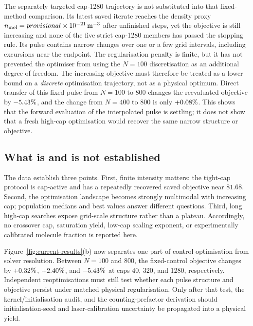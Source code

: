 \documentclass[9pt,a4paper,twocolumn,twoside]{rho-class/rho}
\newcommand{\ShowcaseTwelveEightyDensityScaled}{provisional}%
\newcommand{\ShowcaseHighCapSteps}{unfinished}%
\begin{document}
        The separately targeted cap-1280 trajectory is not substituted into
        that fixed-method comparison. Its latest saved iterate reaches the
        density proxy
        $n_{\rm mol}=\ShowcaseTwelveEightyDensityScaled\times
        10^{-21}\,\mathrm{m}^{-3}$ after
        \ShowcaseHighCapSteps{} steps, yet the objective is still increasing
        and none of the five strict cap-1280 members has passed the stopping
        rule. Its pulse contains narrow changes over one or a few grid
        intervals, including excursions near the endpoint. The regularisation
        penalty is finite, but it has not prevented the optimiser from using
        the $N=100$ discretisation as an additional degree of freedom. The
        increasing objective must therefore be treated as a lower bound on a
        \emph{discrete} optimisation trajectory, not as a physical optimum.
        Direct transfer of this fixed pulse from $N=100$ to 800 changes the
        reevaluated objective by $-5.43\%$,
        and the change from $N=400$ to 800 is only
        $+0.08\%$. This shows that the
        forward evaluation of the interpolated pulse is settling; it does not
        show that a fresh high-cap optimisation would recover the same narrow
        structure or objective.

    \subsection{What is and is not established}

        The data establish three points. First, finite intensity matters: the
        tight-cap protocol is cap-active and has a repeatedly recovered saved
        objective near $81.68$. Second, the optimisation landscape becomes
        strongly multimodal with increasing cap; population medians and best
        values answer different questions. Third, long high-cap searches expose
        grid-scale structure rather than a plateau. Accordingly, no crossover
        cap, saturation yield, low-cap scaling exponent, or experimentally
        calibrated molecule fraction is reported here.

        Figure~\ref{fig:current-results}(b) now separates one part of control
        optimisation from solver resolution. Between $N=100$ and 800, the
        fixed-control objective changes by $+0.32\%$,
        $+2.40\%$, and
        $-5.43\%$ at caps 40, 320, and 1280,
        respectively. Independent reoptimisations must still test whether each
        pulse structure and objective persist under matched physical
        regularisation. Only after that test, the kernel/initialisation audit,
        and the counting-prefactor
        derivation should initialisation-seed and laser-calibration uncertainty
        be propagated into a physical yield.
\end{document}
